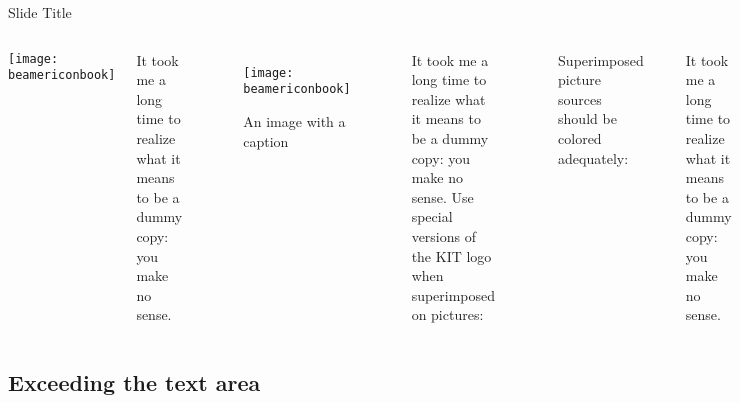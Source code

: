 \documentclass[
 UKenglish%
 ]{beamer}%
\begin{document}
\begin{frame}{Slide Title}
  \begin{columns}[onlytextwidth]
    \column[b]{0.32\hsize}
    \texttt{[image: beamericonbook]}
    
    \medskip\large
    It took me a long time to realize what it means to be a dummy copy: you make no
    sense. 
    \column[b]{0.32\hsize}
    \begin{figure}
      \texttt{[image: beamericonbook]}
      \caption{An image with a caption}
    \end{figure}
    
    \medskip\large
    It took me a long time to realize what it means to be a dummy copy: you make no
    sense. 
    \column[b]{0.32\hsize}
    Use special versions of the KIT logo when superimposed on pictures:\par\smallskip
    \textcolor{KITforestgreen!75!black}{\rule[-0.5\baselineskip]{9em}{3\baselineskip}}\llap{\KITlogo*\kern1em}
    \hfill
    \textcolor{KITlightgreen!40}{\rule[-0.5\baselineskip]{9em}{3\baselineskip}}\llap{\KITlogo**\kern1em}

    \bigskip
    Superimposed picture sources should be colored adequately:\par\smallskip
    \begin{pgfpicture}
    \end{pgfpicture}
    
    \medskip\large
    It took me a long time to realize what it means to be a dummy copy: you make no
    sense. 
  \end{columns}
\end{frame}

\subsection{Exceeding the text area}
\end{document}
